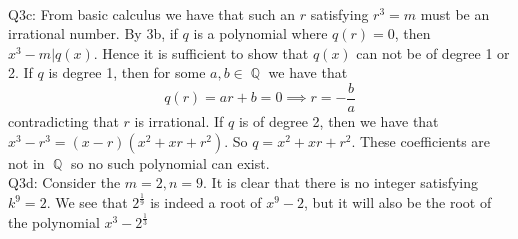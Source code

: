 \documentclass[letterpaper]{article}
\DeclareMathOperator{\Q}{\mathbb{Q}}
\begin{document}
\\ \newline Q3c: From basic calculus we have that such an $r$ satisfying $r^3 = m$ must be an irrational number. By 3b, if $q$ is a polynomial where $q(r)=0$, then $x^3 -m |q(x)$. Hence it is sufficient to show that $q(x)$ can not be of degree 1 or 2. If $q$ is degree 1, then for some $a,b \in \Q$ we have that $$q(r) = ar + b = 0 \implies r =- \frac{b}{a}$$ contradicting that $r$ is irrational. 
If $q$ is of degree 2, then we have that $x^3-r^3 = (x-r) (x^2+xr+r^2)$. So $q=x^2+xr+r^2$. These coefficients are not in $\Q$ so no such polynomial can exist. 
\\ \newline Q3d: Consider the $m=2,n=9$. It is clear that there is no integer satisfying $k^9=2$. We see that $2^\frac{1}{9}$ is indeed a root of $x^9-2$, but it will also be the root of the polynomial $x^3-2^{\frac{1}{3}}$
\end{document}
